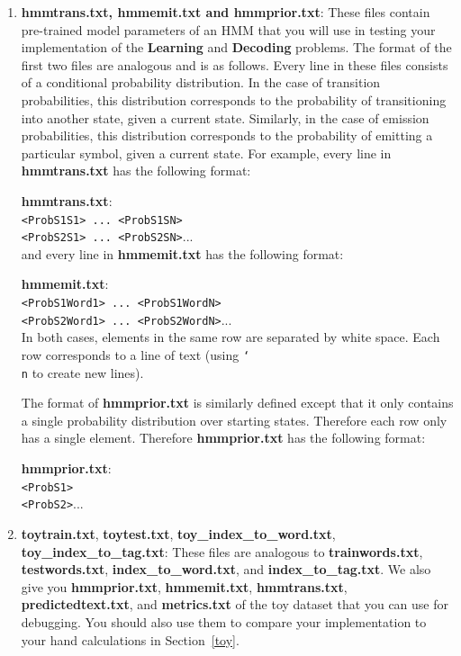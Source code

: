 \documentclass{article}
\begin{document}
\begin{enumerate}
\item \textbf{hmmtrans.txt, hmmemit.txt and hmmprior.txt}: These files contain pre-trained model parameters of an HMM that you will use in testing your implementation of the \textbf{Learning} and \textbf{Decoding} problems. The format of the first two files are analogous and is as follows. Every line in these files consists of a conditional probability distribution. In the case of transition probabilities, this distribution corresponds to the probability of transitioning into another state, given a current state. Similarly, in the case of emission probabilities, this distribution corresponds to the probability of emitting a particular symbol, given a current state. For example, every line in \textbf{hmmtrans.txt} has the following format:
    
    \textbf{hmmtrans.txt}:\\
    \texttt{<ProbS1S1> ... <ProbS1SN>}\\
     \texttt{<ProbS2S1> ... <ProbS2SN>}...\\   
    
and every line in \textbf{hmmemit.txt} has the following format:
    
    \textbf{hmmemit.txt}:\\
    \texttt{<ProbS1Word1> ... <ProbS1WordN>}\\
     \texttt{<ProbS2Word1> ... <ProbS2WordN>}...\\
    
In both cases, elements in the same row are separated by white space. Each row corresponds to a line of text (using \texttt{\char`\\ n} to create new lines).
    
    
The format of \textbf{hmmprior.txt} is similarly defined except that it only contains a single probability distribution over starting states. Therefore each row only has a single element. Therefore \textbf{hmmprior.txt} has the following format:
    
    \textbf{hmmprior.txt}:\\
    \texttt{<ProbS1>}\\
     \texttt{<ProbS2>}...\\

\item \textbf{toytrain.txt}, \textbf{toytest.txt}, \textbf{toy\_index\_to\_word.txt}, \textbf{toy\_index\_to\_tag.txt}: These files are analogous to \textbf{trainwords.txt}, \textbf{testwords.txt}, \textbf{index\_to\_word.txt}, and \textbf{index\_to\_tag.txt}. We also give you \textbf{hmmprior.txt}, \textbf{hmmemit.txt}, \textbf{hmmtrans.txt}, \textbf{predictedtext.txt}, and \textbf{metrics.txt} of the toy dataset that you can use for debugging. You should also use them to compare your implementation to your hand calculations in Section~\ref{toy}.
\end{enumerate}
\end{document}

